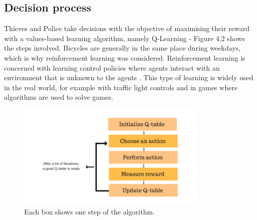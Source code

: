 \documentclass[11pt]{informatics-report}
\begin{document}
\subsection{Decision process}
Thieves and Police take decisions with the objective of maximising their reward with a values-based learning algorithm, namely Q-Learning \cite{q1992} - Figure 4.2 shows the steps involved. Bicycles are generally in the same place during weekdays, which is why reinforcement learning was considered. Reinforcement learning is concerned with learning control policies where agents interact with an environment that is unknown to the agents \cite{qlearning}. This type of learning is widely used in the real world, for example with traffic light controls and in games where algorithms are used to solve games. \par 

\begin{figure}[h]
\centering
\includegraphics[width = 0.8\textwidth]{qlearningflow.png}
\caption{Each box shows one step of the algorithm. \cite{freecodecamp}}
\end{figure}
\end{document}
